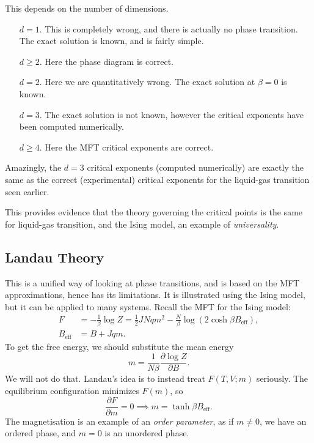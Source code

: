 \documentclass[12pt]{article}
\begin{document}
This depends on the number of dimensions.
\begin{itemize}
	\item[$d = 1$.] This is completely wrong, and there is actually no phase transition. The exact solution is known, and is fairly simple.
	\item[$d \geq 2$.] Here the phase diagram is correct.
	\item[$d = 2$.] Here we are quantitatively wrong. The exact solution at $\beta = 0$ is known.
	\item[$d = 3$.] The exact solution is not known, however the critical exponents have been computed numerically.
	\item[$d \geq 4$.] Here the MFT critical exponents are correct.
\end{itemize}

Amazingly, the $d = 3$ critical exponents (computed numerically) are exactly the same as the correct (experimental) critical exponents for the liquid-gas transition seen earlier.

This provides evidence that the theory governing the critical points is the same for liquid-gas transition, and the Ising model, an example of \emph{universality}.

\subsection{Landau Theory}
\label{sub:lt}

This is a unified way of looking at phase transitions, and is based on the MFT approximations, hence has its limitations. It is illustrated using the Ising model, but it can be applied to many systems. Recall the MFT for the Ising model:
\begin{align*}
	F &= - \frac{1}{\beta} \log Z = \frac{1}{2} J N q m^2 - \frac{N}{\beta} \log(2 \cosh \beta B_{\mathrm{eff}}), \\
	B_{\mathrm{eff}} &= B + Jqm.
\end{align*}
To get the free energy, we should substitute the mean energy
\[
m = \frac{1}{N \beta} \frac{\partial \log Z}{\partial B}.
\]
We will not do that. Landau's idea is to instead treat $F(T, V; m)$ seriously. The equilibrium configuration minimizes $F(m)$, so
\[
\frac{\partial F}{\partial m} = 0 \implies m = \tanh \beta B_{\mathrm{eff}}.
\]
The magnetisation is an example of an \emph{order parameter}, as if $m \neq 0$, we have an ordered phase, and $m = 0$ is an unordered phase.
\end{document}
